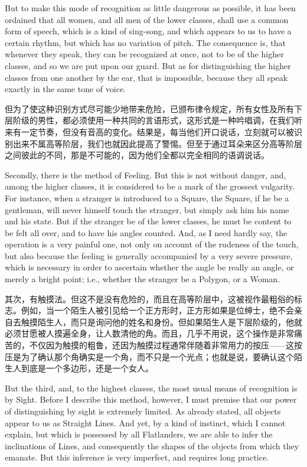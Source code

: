 \documentclass[12pt,UTF8]{ctexbook}
\begin{document}
But to make this mode of recognition as little dangerous as possible, it has been ordained that all women, and all men of the lower classes, shall use a common form of speech, which is a kind of sing-song, and which appears to us to have a certain rhythm, but which has no variation of pitch. The consequence is, that whenever they speak, they can be recognized at once, not to be of the higher classes, and so we are put upon our guard. But as for distinguishing the higher classes from one another by the ear, that is impossible, because they all speak exactly in the same tone of voice.

但为了使这种识别方式尽可能少地带来危险，已颁布律令规定，所有女性及所有下层阶级的男性，都必须使用一种共同的言语形式，这形式是一种吟唱调，在我们听来有一定节奏，但没有音高的变化。结果是，每当他们开口说话，立刻就可以被识别出来不属高等阶层，我们也就因此提高了警惕。但至于通过耳朵来区分高等阶层之间彼此的不同，那是不可能的，因为他们全都以完全相同的语调说话。

Secondly, there is the method of Feeling. But this is not without danger, and, among the higher classes, it is considered to be a mark of the grossest vulgarity. For instance, when a stranger is introduced to a Square, the Square, if he be a gentleman, will never himself touch the stranger, but simply ask him his name and his state. But if the stranger be of the lower classes, he must be content to be felt all over, and to have his angles counted. And, as I need hardly say, the operation is a very painful one, not only on account of the rudeness of the touch, but also because the feeling is generally accompanied by a very severe pressure, which is necessary in order to ascertain whether the angle be really an angle, or merely a bright point; i.e., whether the stranger be a Polygon, or a Woman.

其次，有触摸法。但这不是没有危险的，而且在高等阶层中，这被视作最粗俗的标志。例如，当一个陌生人被引见给一个正方形时，正方形如果是位绅士，绝不会亲自去触摸陌生人，而只是询问他的姓名和身份。但如果陌生人是下层阶级的，他就必须甘愿被人摸遍全身，让人数清他的角。而且，几乎不用说，这个操作是非常痛苦的，不仅因为触摸的粗鲁，还因为触摸过程通常伴随着非常用力的按压——这按压是为了确认那个角确实是一个角，而不只是一个光点；也就是说，要确认这个陌生人到底是一个多边形，还是一个女人。

But the third, and, to the highest classes, the most usual means of recognition is by Sight. Before I describe this method, however, I must premise that our power of distinguishing by sight is extremely limited. As already stated, all objects appear to us as Straight Lines. And yet, by a kind of instinct, which I cannot explain, but which is possessed by all Flatlanders, we are able to infer the inclinations of Lines, and consequently the shapes of the objects from which they emanate. But this inference is very imperfect, and requires long practice.
\end{document}
